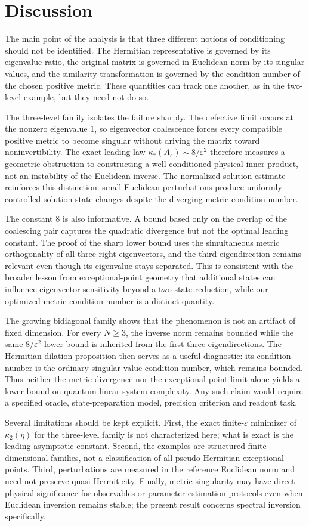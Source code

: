 \section{Discussion}
The main point of the analysis is that three different notions of conditioning should not be
identified.  The Hermitian representative is governed by its eigenvalue ratio, the original
matrix is governed in Euclidean norm by its singular values, and the similarity transformation
is governed by the condition number of the chosen positive metric.  These quantities can track
one another, as in the two-level example, but they need not do so.

The three-level family isolates the failure sharply.  The defective limit occurs at the
nonzero eigenvalue $1$, so eigenvector coalescence forces every compatible positive metric to
become singular without driving the matrix toward noninvertibility.  The exact leading law
$\kappa_*(A_\varepsilon)\sim8/\varepsilon^2$ therefore measures a geometric obstruction to
constructing a well-conditioned physical inner product, not an instability of the Euclidean
inverse.  The normalized-solution estimate reinforces this distinction: small Euclidean
perturbations produce uniformly controlled solution-state changes despite the diverging metric
condition number.

The constant $8$ is also informative.  A bound based only on the overlap of the coalescing
pair captures the quadratic divergence but not the optimal leading constant.  The proof of the
sharp lower bound uses the simultaneous metric orthogonality of all three right eigenvectors,
and the third eigendirection remains relevant even though its eigenvalue stays separated.
This is consistent with the broader lesson from exceptional-point geometry that additional
states can influence eigenvector sensitivity beyond a two-state reduction, while our optimized
metric condition number is a distinct quantity.

The growing bidiagonal family shows that the phenomenon is not an artifact of fixed dimension.
For every $N\ge3$, the inverse norm remains bounded while the same $8/\varepsilon^2$ lower bound
is inherited from the first three eigendirections.  The Hermitian-dilation proposition then
serves as a useful diagnostic: its condition number is the ordinary singular-value condition
number, which remains bounded.  Thus neither the metric divergence nor the exceptional-point
limit alone yields a lower bound on quantum linear-system complexity.  Any such claim would
require a specified oracle, state-preparation model, precision criterion and readout task.

Several limitations should be kept explicit.  First, the exact finite-$\varepsilon$ minimizer
of $\kappa_2(\eta)$ for the three-level family is not characterized here; what is exact is the
leading asymptotic constant.  Second, the examples are structured finite-dimensional families,
not a classification of all pseudo-Hermitian exceptional points.  Third, perturbations are
measured in the reference Euclidean norm and need not preserve quasi-Hermiticity.  Finally,
metric singularity may have direct physical significance for observables or parameter-estimation
protocols even when Euclidean inversion remains stable; the present result concerns spectral
inversion specifically.
